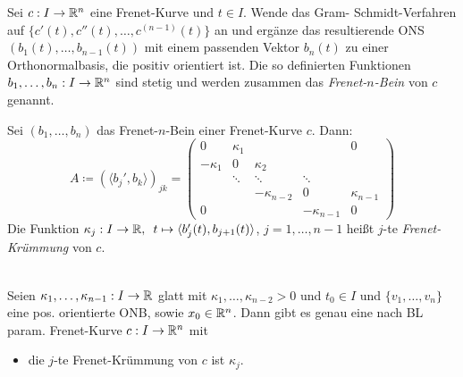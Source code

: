 \documentclass{cheat-sheet}
\begin{document}
\begin{defn}
  Sei $c : I \to \mathbb{R}^n$ eine Frenet-Kurve und $t \in I$. Wende das Gram- Schmidt-Verfahren auf $\{ c'(t), c''(t), \ldots, c^{(n-1)}(t) \}$ an und ergänze das resultierende ONS $(b_1(t), \ldots, b_{n-1}(t))$ mit einem passenden Vektor $b_n(t)$ zu einer Orthonormalbasis, die positiv orientiert ist. Die so definierten Funktionen $b_1, \ldots, b_n : I \to \mathbb{R}^n$ sind stetig und werden zusammen das \emph{Frenet-$n$-Bein} von $c$ genannt.
\end{defn}

\begin{defn}
  Sei $(b_1, \ldots, b_n)$ das Frenet-$n$-Bein einer Frenet-Kurve $c$. Dann:
  \[ A \coloneqq (\langle b_j' , b_k \rangle)_{jk} = \begin{pmatrix}
    0 & \kappa_1 &&& 0 \\
    - \kappa_1 & 0 & \kappa_2 \\
    & \ddots & \ddots & \ddots \\
    && - \kappa_{n-2} & 0 & \kappa_{n-1} \\
    0 &&& - \kappa_{n-1} & 0
  \end{pmatrix} \]
  Die Funktion $\kappa_j : I \to \mathbb{R}, \enspace t \mapsto \langle b_j'(t) , b_{j+1}(t) \rangle$, $j = 1, \ldots, n - 1$ heißt $j$-te \emph{Frenet-Krümmung} von $c$.
\end{defn}


\begin{satz}\mbox{}\\
  Seien $\kappa_1, \ldots, \kappa_{n-1} : I \to \mathbb{R}$ glatt mit $\kappa_1, \ldots, \kappa_{n-2} > 0$ und $t_0 \in I$ und $\{ v_1, \ldots, v_n \}$ eine pos. orientierte ONB, sowie $x_0 \in \mathbb{R}^n$. Dann gibt es genau eine nach BL param. Frenet-Kurve $c : I \to \mathbb{R}^n$ mit
  \begin{itemize}
    \item die $j$-te Frenet-Krümmung von $c$ ist $\kappa_j$.
  \end{itemize}
\end{satz}
\end{document}
